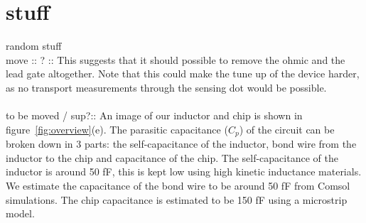 \documentclass{article}
\begin{document}
\section{stuff} %
\label{sec:stuff}
random stuff\\
move :: ? :: This  suggests that it should possible to remove the ohmic and the lead gate altogether. Note that this could make the tune up of the device harder, as no transport measurements through the sensing dot would be possible.
\\ \\
to be moved / sup?:: 
An image of our inductor and chip is shown in figure\ \ref{fig:overview}(e). The parasitic capacitance ($C_p$)  of the circuit can be broken down in 3 parts: the self-capacitance of the inductor, bond wire from the inductor to the chip and capacitance of the chip. The self-capacitance of the inductor is around 50 fF, this is kept low using high kinetic inductance materials. We estimate the capacitance of the bond wire to be around 50 fF from Comsol simulations. The chip capacitance is estimated to be 150 fF using a microstrip model.

\printbibliography
\end{document}
